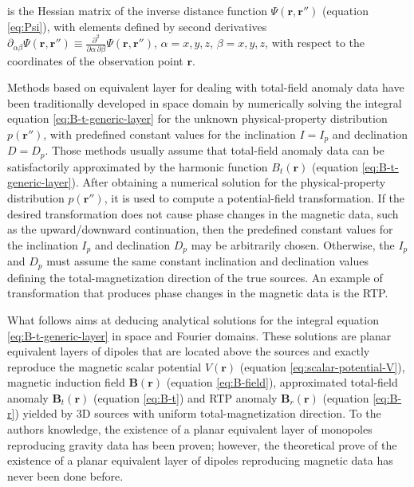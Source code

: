 is the Hessian matrix of the inverse distance function 
$\Psi(\mathbf{r}, \mathbf{r}'')$ (equation \ref{eq:Psi}), with elements defined
by second derivatives $\partial_{\alpha\beta} \Psi(\mathbf{r}, \mathbf{r}'') \equiv 
\frac{\partial^{2}}{\partial\alpha \, \partial\beta} \Psi(\mathbf{r}, \mathbf{r}'')$,
$\alpha = x, y, z$, $\beta = x, y, z$, with respect to the coordinates of
the observation point $\mathbf{r}$.

Methods based on equivalent layer for dealing with total-field anomaly data 
have been traditionally developed in space domain 
\cite[e.g.,][]{silva_1986, oliveirajr-etal_2013}
by numerically solving the integral equation \ref{eq:B-t-generic-layer} 
for the unknown physical-property distribution $p(\mathbf{r}'')$, 
with predefined constant values for the inclination $I = I_{p}$ and declination $D = D_{p}$. 
Those methods usually assume that total-field anomaly data 
can be satisfactorily approximated by the harmonic function $B_{t}(\mathbf{r})$
(equation \ref{eq:B-t-generic-layer}).
After obtaining a numerical solution for the physical-property distribution 
$p(\mathbf{r}'')$, it is used to compute a potential-field transformation. 
If the desired transformation does not
cause phase changes in the magnetic data, such as the upward/downward continuation, 
then the predefined constant values for the inclination $I_{p}$ and declination $D_{p}$ 
may be arbitrarily chosen. 
Otherwise, the $I_{p}$ and $D_{p}$ must assume the same constant inclination and declination
values defining the total-magnetization direction of the true sources. An example of 
transformation that produces phase changes in the magnetic data is the RTP.

What follows aims at deducing analytical solutions for the integral equation
\ref{eq:B-t-generic-layer} in space and Fourier domains. 
These solutions are planar equivalent layers of dipoles that are located above the sources
and exactly reproduce the magnetic 
scalar potential $V(\mathbf{r})$ (equation \ref{eq:scalar-potential-V}), magnetic induction 
field $\mathbf{B}(\mathbf{r})$ (equation \ref{eq:B-field}),
approximated total-field anomaly $\mathbf{B}_{t}(\mathbf{r})$ (equation \ref{eq:B-t}) 
and RTP anomaly $\mathbf{B}_{r}(\mathbf{r})$ (equation \ref{eq:B-r})
yielded by 3D sources with uniform total-magnetization direction. 
To the authors knowledge, the existence of a planar equivalent layer of monopoles
reproducing gravity data has been proven;
however, the theoretical prove of the existence of a planar equivalent layer of dipoles 
reproducing magnetic data has never been done before.


